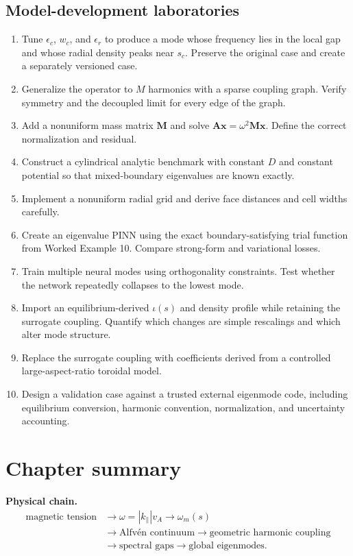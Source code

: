 \subsection{Model-development laboratories}
\begin{enumerate}[leftmargin=1.8em]
\item Tune $\epsilon_c$, $w_c$, and $\epsilon_r$ to produce a mode whose frequency lies in the local gap and whose radial density peaks near $s_c$. Preserve the original case and create a separately versioned case.
\item Generalize the operator to $M$ harmonics with a sparse coupling graph. Verify symmetry and the decoupled limit for every edge of the graph.
\item Add a nonuniform mass matrix $\mathbf M$ and solve $\mathbf A\mathbf x=\omega^2\mathbf M\mathbf x$. Define the correct normalization and residual.
\item Construct a cylindrical analytic benchmark with constant $D$ and constant potential so that mixed-boundary eigenvalues are known exactly.
\item Implement a nonuniform radial grid and derive face distances and cell widths carefully.
\item Create an eigenvalue PINN using the exact boundary-satisfying trial function from Worked Example 10. Compare strong-form and variational losses.
\item Train multiple neural modes using orthogonality constraints. Test whether the network repeatedly collapses to the lowest mode.
\item Import an equilibrium-derived $\iota(s)$ and density profile while retaining the surrogate coupling. Quantify which changes are simple rescalings and which alter mode structure.
\item Replace the surrogate coupling with coefficients derived from a controlled large-aspect-ratio toroidal model.
\item Design a validation case against a trusted external eigenmode code, including equilibrium conversion, harmonic convention, normalization, and uncertainty accounting.
\end{enumerate}

\section{Chapter summary}
\label{sec:summary}

\begin{physicsbox}
\textbf{Physical chain.}
\begin{equation*}
\begin{aligned}
\text{magnetic tension}
&\rightarrow \omega=|k_\parallel|v_A
\rightarrow \omega_m(s)\\
&\rightarrow \text{Alfv\'en continuum}
\rightarrow \text{geometric harmonic coupling}\\
&\rightarrow \text{spectral gaps}
\rightarrow \text{global eigenmodes}.
\end{aligned}
\end{equation*}
\end{physicsbox}

